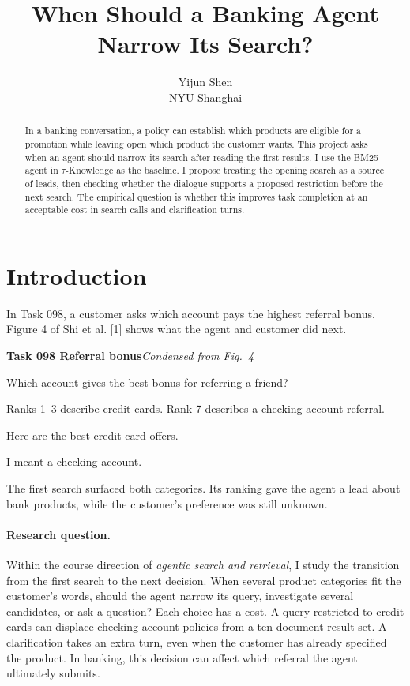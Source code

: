 \documentclass{article}
\title{When Should a Banking Agent Narrow Its Search?}
\author{Yijun Shen\\NYU Shanghai}
\newenvironment{tracecard}[2]{\par\addvspace{5pt}\noindent\begin{minipage}{\linewidth}
  \setlength{\parindent}{0pt}\small
  \colorbox{cardwash}{\parbox{\dimexpr\linewidth-2\fboxsep\relax}{\strut\textcolor{cardink}{\bfseries #1}\hfill #2}}\par\smallskip
}{\end{minipage}\par\addvspace{4pt}}
\newcommand{\turnline}[2]{\noindent\makebox[.17\linewidth][l]{\textcolor{cardink}{\bfseries #1}}\parbox[t]{.83\linewidth}{#2\strut}\par}
\begin{document}
\maketitle
\begin{abstract}
In a banking conversation, a policy can establish which products are eligible for a promotion while leaving open which product the customer wants. This project asks when an agent should narrow its search after reading the first results. I use the BM25 agent in $\tau$-Knowledge as the baseline. I propose treating the opening search as a source of leads, then checking whether the dialogue supports a proposed restriction before the next search. The empirical question is whether this improves task completion at an acceptable cost in search calls and clarification turns.
\end{abstract}

\section{Introduction}
In Task 098, a customer asks which account pays the highest referral bonus. Figure 4 of Shi et al. [1] shows what the agent and customer did next.

\begin{tracecard}{Task 098 \enspace Referral bonus}{\emph{Condensed from Fig.~4}}
\turnline{Customer}{Which account gives the best bonus for referring a friend?}
\turnline{KB search}{Ranks 1--3 describe credit cards. Rank 7 describes a checking-account referral.}
\turnline{Agent}{Here are the best credit-card offers.}
\turnline{Customer}{I meant a checking account.}
\end{tracecard}

The first search surfaced both categories. Its ranking gave the agent a lead about bank products, while the customer's preference was still unknown.

\paragraph{Research question.} Within the course direction of \emph{agentic search and retrieval}, I study the transition from the first search to the next decision. When several product categories fit the customer's words, should the agent narrow its query, investigate several candidates, or ask a question? Each choice has a cost. A query restricted to credit cards can displace checking-account policies from a ten-document result set. A clarification takes an extra turn, even when the customer has already specified the product. In banking, this decision can affect which referral the agent ultimately submits.
\end{document}
